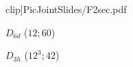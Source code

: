 \documentclass{beamer}
\begin{document}
\begin{frame}
\begin{center}
\begin{minipage}[b]{24mm}
{clip]{PicJointSlides/F2sec.pdf}}\par
 $D_{6d}$ ($12;60$) 
\end{minipage}
\begin{minipage}[b]{24mm}
\centering
{}\par
 $D_{3h}$ ($12^3;42$) 
\end{minipage}
\begin{minipage}[b]{24mm}
\centering
\resizebox{20mm}{!}{\includegraphics[bb=1 1 439 380,
}
\end{minipage}
\end{center}
\end{frame}
\end{document}
